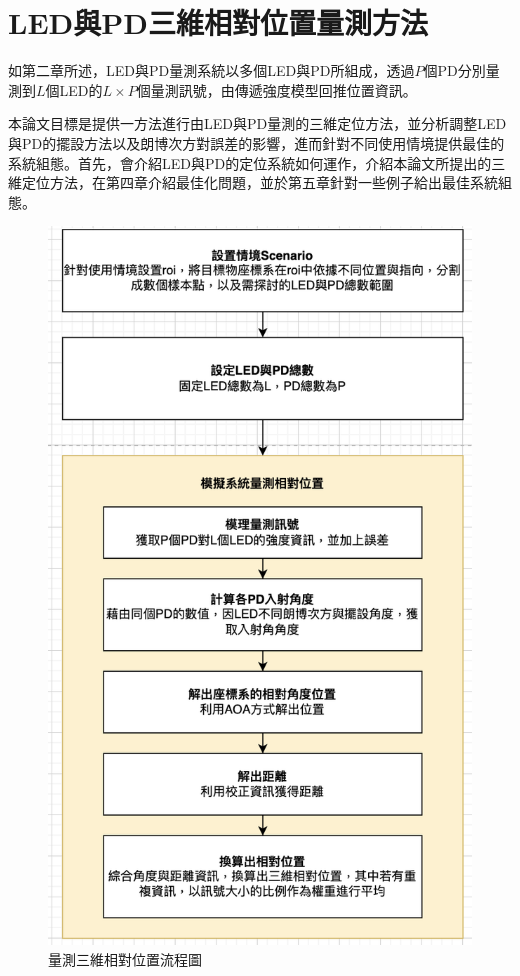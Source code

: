 
\chapter{LED與PD三維相對位置量測方法}
\label{chp:3}

如第二章所述，LED與PD量測系統以多個LED與PD所組成，透過$P$個PD分別量測到$L$個LED的$L\times P$個量測訊號，由傳遞強度模型回推位置資訊。

本論文目標是提供一方法進行由LED與PD量測的三維定位方法，並分析調整LED與PD的擺設方法以及朗博次方對誤差的影響，進而針對不同使用情境提供最佳的系統組態。首先，會介紹LED與PD的定位系統如何運作，介紹本論文所提出的三維定位方法，在第四章介紹最佳化問題，並於第五章針對一些例子給出最佳系統組態。

\begin{figure}[ht]
    \centering
    \includegraphics[width=12cm]{ch3pic/flowchart_pos.png}
    \caption{量測三維相對位置流程圖}
    \label{flow:pos}
\end{figure}


